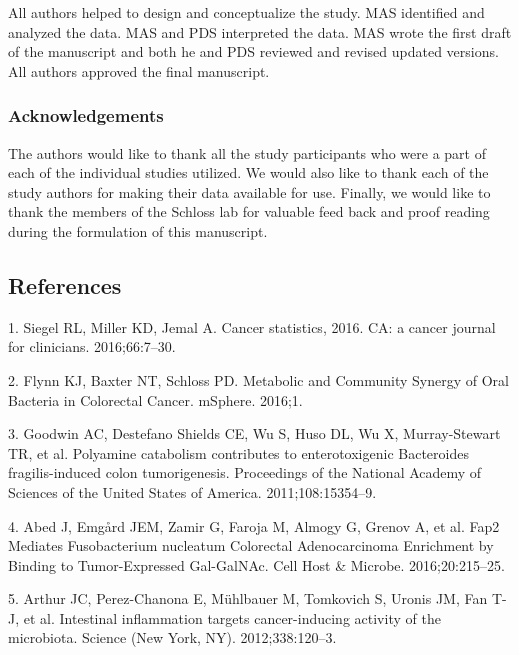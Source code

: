 \documentclass[12pt,]{article}
\begin{document}
All authors helped to design and conceptualize the study. MAS identified
and analyzed the data. MAS and PDS interpreted the data. MAS wrote the
first draft of the manuscript and both he and PDS reviewed and revised
updated versions. All authors approved the final manuscript.

\subsubsection{Acknowledgements}\label{acknowledgements}

The authors would like to thank all the study participants who were a
part of each of the individual studies utilized. We would also like to
thank each of the study authors for making their data available for use.
Finally, we would like to thank the members of the Schloss lab for
valuable feed back and proof reading during the formulation of this
manuscript.

\newpage

\subsection{References}\label{references}

\hypertarget{refs}{}
\hypertarget{ref-siegel_cancer_2016}{}
1. Siegel RL, Miller KD, Jemal A. Cancer statistics, 2016. CA: a cancer
journal for clinicians. 2016;66:7--30.

\hypertarget{ref-flynn_metabolic_2016}{}
2. Flynn KJ, Baxter NT, Schloss PD. Metabolic and Community Synergy of
Oral Bacteria in Colorectal Cancer. mSphere. 2016;1.

\hypertarget{ref-goodwin_polyamine_2011}{}
3. Goodwin AC, Destefano Shields CE, Wu S, Huso DL, Wu X, Murray-Stewart
TR, et al. Polyamine catabolism contributes to enterotoxigenic
Bacteroides fragilis-induced colon tumorigenesis. Proceedings of the
National Academy of Sciences of the United States of America.
2011;108:15354--9.

\hypertarget{ref-abed_fap2_2016}{}
4. Abed J, Emgård JEM, Zamir G, Faroja M, Almogy G, Grenov A, et al.
Fap2 Mediates Fusobacterium nucleatum Colorectal Adenocarcinoma
Enrichment by Binding to Tumor-Expressed Gal-GalNAc. Cell Host \&
Microbe. 2016;20:215--25.

\hypertarget{ref-arthur_intestinal_2012}{}
5. Arthur JC, Perez-Chanona E, Mühlbauer M, Tomkovich S, Uronis JM, Fan
T-J, et al. Intestinal inflammation targets cancer-inducing activity of
the microbiota. Science (New York, NY). 2012;338:120--3.
\end{document}
